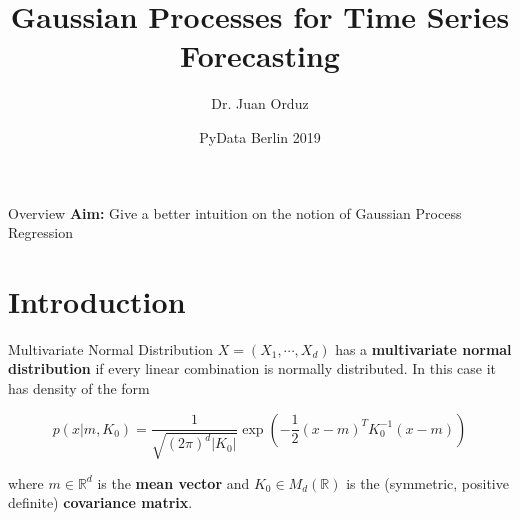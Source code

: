 \documentclass[10pt]{beamer}
\title[Gaussian Processes for Time Series Forecasting] %
{Gaussian Processes for Time Series Forecasting}
\author[Dr. Juan Orduz] %
{Dr. Juan Orduz}
\institute[PyData Berlin 2019] %
{

}
\date[ PyData Berlin 2019] %
{ PyData Berlin 2019}
\begin{document}
\begin{frame}
  \titlepage
\end{frame}


\begin{frame}{Overview}
{{\bf Aim:} Give a better intuition on the notion of Gaussian Process Regression}
\tableofcontents
\end{frame}

\section{Introduction}

\begin{frame}{Multivariate Normal Distribution}{\cite{multivariate_normal_orduz_2019}}
$X = (X_1, \cdots, X_d)$ has a{ \bf multivariate normal distribution} if every linear combination is normally distributed. In this case it has density of the form

$$
p(x|m,K_0) =\frac{1}{\sqrt{(2\pi)^{d}|K_0|}}\exp\left(-\frac{1}{2}(x - m)^T K_0^{-1}(x - m)\right)
$$

where $m \in \mathbb{R}^d$ is the {\bf mean vector} and  $K_0 \in M_d(\mathbb{R})$ is the (symmetric, positive definite) {\bf covariance matrix}.


\end{frame}
\end{document}
